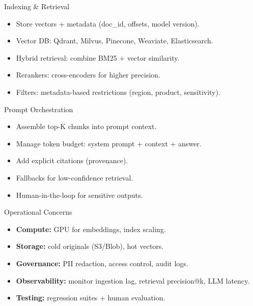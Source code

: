 \documentclass{beamer}
\begin{document}
\begin{frame}{Indexing \& Retrieval}
\begin{itemize}
    \item Store vectors + metadata (doc\_id, offsets, model version).
    \item Vector DB: Qdrant, Milvus, Pinecone, Weaviate, Elasticsearch.
    \item Hybrid retrieval: combine BM25 + vector similarity.
    \item Rerankers: cross-encoders for higher precision.
    \item Filters: metadata-based restrictions (region, product, sensitivity).
\end{itemize}
\end{frame}


\begin{frame}{Prompt Orchestration}
\begin{itemize}
    \item Assemble top-K chunks into prompt context.
    \item Manage token budget: system prompt + context + answer.
    \item Add explicit citations (provenance).
    \item Fallbacks for low-confidence retrieval.
    \item Human-in-the-loop for sensitive outputs.
\end{itemize}
\end{frame}


\begin{frame}{Operational Concerns}
\begin{itemize}
    \item \textbf{Compute:} GPU for embeddings, index scaling.
    \item \textbf{Storage:} cold originals (S3/Blob), hot vectors.
    \item \textbf{Governance:} PII redaction, access control, audit logs.
    \item \textbf{Observability:} monitor ingestion lag, retrieval precision@k, LLM latency.
    \item \textbf{Testing:} regression suites + human evaluation.
\end{itemize}
\end{frame}

\end{document}
